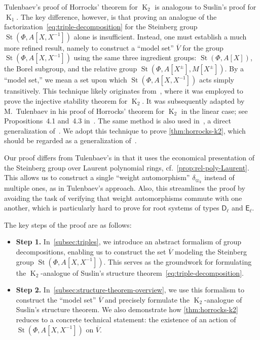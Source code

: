 \documentclass[oneside, 10pt]{amsart}
\DeclareMathOperator{\St}{St}
\DeclareMathOperator{\K}{K}
\newcommand{\rD}{\mathsf{D}}
\newcommand{\rE}{\mathsf{E}}
\newcommand{\inv}{^{-1}}
\numberwithin{equation}{section}
\numberwithin{thm}{section}
\numberwithin{lemma}{section}
\theoremstyle{definition}
\theoremstyle{remark}
\begin{document}
Tulenbaev's proof of Horrocks' theorem for \( \K_2 \) is analogous to Suslin's proof for \( \K_1 \).
The key difference, however, is that proving an analogue of the factorization~\eqref{eq:triple-decomposition} for the Steinberg group
\( \St(\Phi, A[X, X\inv]) \) alone is insufficient.
Instead, one must establish a much more refined result, namely to construct a ``model set'' \( \overline{V} \) for the group
\( \St(\Phi, A[X, X\inv]) \) using the same three ingredient groups: \( \St(\Phi, A[X]) \), the Borel subgroup, and the relative group
\( \St(\Phi, A[X^\pm], M[X^\pm]) \).
By a ``model set,'' we mean a set upon which \( \St(\Phi, A[X, X\inv]) \) acts simply transitively.
This technique likely originates from~\cite{ST76}, where it was employed to prove the injective stability theorem for \( \K_2 \).
It was subsequently adapted by M.~Tulenbaev in his proof of Horrocks' theorem for \( \K_2 \) in the linear case; see Propositions~4.1 and~4.3 in~\cite{Tu83}.
The same method is also used in~\cite[Theorem~3]{LS20}, a direct generalization of~\cite[Proposition~4.3]{Tu83}.
We adopt this technique to prove \cref{thm:horrocks-k2}, which should be regarded as a generalization of~\cite[Proposition~4.1]{Tu83}.

Our proof differs from Tulenbaev's in that it uses the economical presentation of the Steinberg group over Laurent polynomial rings, cf.~\cref{prop:rel-poly-Laurent}.
This allows us to construct a single ``weight automorphism'' $\delta_{\varpi_k}$ instead of multiple ones, as in Tulenbaev's approach.
Also, this streamlines the proof by avoiding the task of verifying that weight automorphisms commute with one another,
which is particularly hard to prove for root systems of types $\rD_\ell$ and $\rE_\ell$.

The key steps of the proof are as follows:
\begin{itemize}
\item \textbf{Step 1.} In~\cref{subsec:triples}, we introduce an abstract formalism of group decompositions, enabling us to construct the set \( \overline{V} \) modeling
the Steinberg group \( \St(\Phi, A[X, X\inv]) \). This serves as the groundwork for formulating the \( \K_2 \)-analogue of Suslin's structure theorem~\eqref{eq:triple-decomposition}.
\item \textbf{Step 2.} In~\cref{subsec:structure-theorem-overview}, we use this formalism to construct the ``model set'' \( \overline{V} \) and precisely formulate the \( \K_2 \)-analogue
of Suslin's structure theorem. We also demonstrate how \cref{thm:horrocks-k2} reduces to a concrete technical statement: the existence of an action of \( \St(\Phi, A[X, X\inv]) \) on \( \overline{V} \).
\end{itemize}
\end{document}
